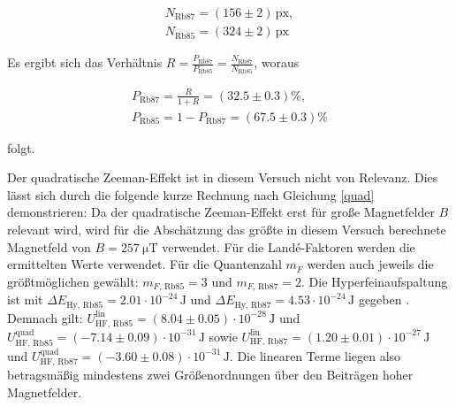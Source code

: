 \begin{eqnarray}
	N_{\text{Rb}87} = (156 \pm 2)\, \text{px},\\
	N_{\text{Rb}85} = (324 \pm 2)\, \text{px}
\end{eqnarray}

Es ergibt sich das Verhältnis $R = \frac{P_{\text{Rb}87}}{P_{\text{Rb}85}} = \frac{N_{\text{Rb}87}}{N_{\text{Rb}85}}$, woraus

\begin{eqnarray}
	P_{\text{Rb}87} = \frac{R}{1 + R} = (32.5 \pm 0.3) \%, \\
	P_{\text{Rb}85} = 1 - P_{\text{Rb}87} = (67.5 \pm 0.3) \%
\end{eqnarray}

folgt.

Der quadratische Zeeman-Effekt ist in diesem Versuch nicht von Relevanz. Dies lässt sich 
durch die folgende kurze Rechnung nach Gleichung \eqref{quad} demonstrieren: Da der quadratische 
Zeeman-Effekt erst für große Magnetfelder $B$ relevant wird, wird für die Abschätzung das 
größte in diesem Versuch berechnete Magnetfeld von $B = \SI{257}{\micro \tesla}$ verwendet. Für die 
Landé-Faktoren werden die ermittelten Werte verwendet. Für die Quantenzahl $m_F$ werden auch
 jeweils die größtmöglichen gewählt: $m_{F, \, \text{Rb}85} = 3$ und $m_{F, \, \text{Rb}87} = 2$.
  Die Hyperfeinaufspaltung ist mit $\Delta E_{\text{Hy}, \, \text{Rb}85} = {2.01 \cdot 10^{-24}}\, \text{J}$ und
   $\Delta E_{\text{Hy}, \, \text{Rb}87} = {4.53 \cdot 10^{-24}}\, \text{J}$ gegeben \cite{V21}.
   Demnach gilt: 
    $U_{\text{HF}, \, \text{Rb}85}^\text{lin} = {(8.04 \pm 0.05) \cdot 10^{-28}}\, \text{J}$ und 
    $U_{\text{HF}, \, \text{Rb}85}^\text{quad} = {(-7.14 \pm 0.09) \cdot 10^{-31}}\, \text{J}$ sowie
     $U_{\text{HF}, \, \text{Rb}87}^\text{lin} = {(1.20 \pm 0.01) \cdot 10^{-27}}\, \text{J}$ und
     $U_{\text{HF}, \, \text{Rb}87}^\text{quad} = {(-3.60 \pm 0.08) \cdot 10^{-31}}\, \text{J}$. 
     Die linearen Terme liegen also betragsmäßig mindestens zwei Größenordnungen über den Beiträgen hoher Magnetfelder. 
